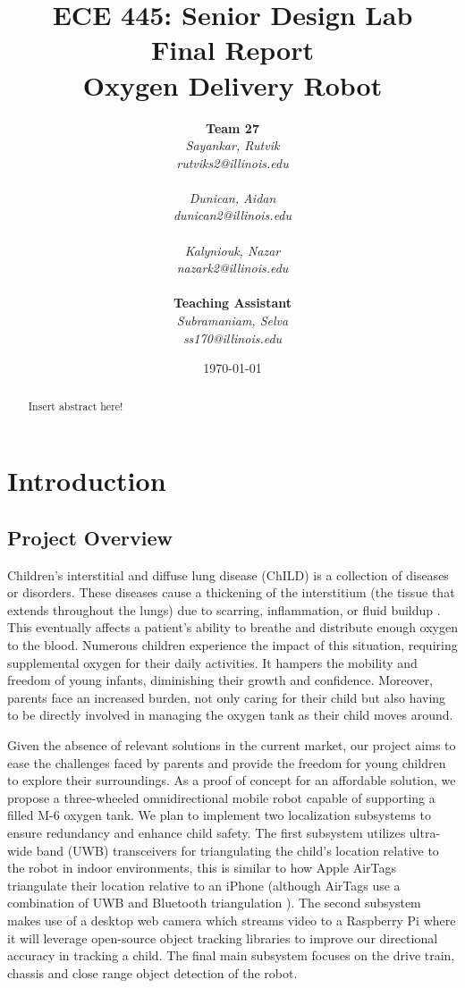 \documentclass{report}
\title{ECE 445: Senior Design Lab \\ Final Report \\ Oxygen Delivery Robot} %
\author {
    \textbf{Team 27} \\ 
    \textit{Sayankar, Rutvik}\\
    \textit{rutviks2@illinois.edu} \\
    \hfill \\ 
    \textit{Dunican, Aidan}\\
    \textit{dunican2@illinois.edu} \\
    \hfill \\ 
    \textit{Kalyniouk, Nazar}\\
    \textit{nazark2@illinois.edu} \\
    \hfill \\ 
    \textbf{Teaching Assistant} \\ 
    \textit{Subramaniam, Selva} \\
    \textit{ss170@illinois.edu} 
}
\date{\today} %
\begin{document}
    \maketitle %

    \begin{abstract}
        Insert abstract here!
    \end{abstract}
    
    \pagebreak
    \tableofcontents %
    \pagebreak

    \chapter{Introduction}
    \section{Project Overview}
    Children's interstitial and diffuse lung disease (ChILD) is a collection of diseases or disorders. These diseases cause a thickening of the interstitium (the tissue that extends throughout the lungs) due to scarring, inflammation, or fluid buildup \cite{ChILD-2022}. This eventually affects a patient’s ability to breathe and distribute enough oxygen to the blood. Numerous children experience the impact of this situation, requiring supplemental oxygen for their daily activities. It hampers the mobility and freedom of young infants, diminishing their growth and confidence. Moreover, parents face an increased burden, not only caring for their child but also having to be directly involved in managing the oxygen tank as their child moves around.

    Given the absence of relevant solutions in the current market, our project aims to ease the challenges faced by parents and provide the freedom for young children to explore their surroundings. As a proof of concept for an affordable solution, we propose a three-wheeled omnidirectional mobile robot capable of supporting a filled M-6 oxygen tank. We plan to implement two localization subsystems to ensure redundancy and enhance child safety. The first subsystem utilizes ultra-wide band (UWB) transceivers for triangulating the child's location relative to the robot in indoor environments, this is similar to how Apple AirTags triangulate their location relative to an iPhone \cite{airtag_uwb} (although AirTags use a combination of UWB and Bluetooth triangulation \cite{airtag_ble}). The second subsystem makes use of a desktop web camera which streams video to a Raspberry Pi where it will leverage open-source object tracking libraries to improve our directional accuracy in tracking a child. The final main subsystem focuses on the drive train, chassis and close range object detection of the robot.
\end{document}
